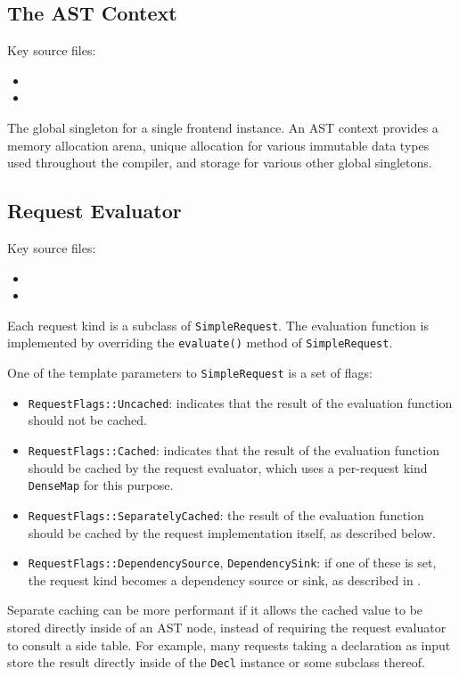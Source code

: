 \documentclass[../generics]{subfiles}
\begin{document}
\subsection*{The AST Context}
Key source files:
\begin{itemize}
\item {}
\item {}
\end{itemize}

The global singleton for a single frontend instance. An AST context provides a memory allocation arena, unique allocation for various immutable data types used throughout the compiler, and storage for various other global singletons.

\subsection*{Request Evaluator}
Key source files:
\begin{itemize}
\item {}
\item {}
\end{itemize}
Each request kind is a subclass of \texttt{SimpleRequest}. The evaluation function is implemented by overriding the \texttt{evaluate()} method of \texttt{SimpleRequest}.

One of the template parameters to \texttt{SimpleRequest} is a set of flags:
\begin{itemize}
\item \texttt{RequestFlags::Uncached}: indicates that the result of the evaluation function should not be cached.
\item \texttt{RequestFlags::Cached}: indicates that the result of the evaluation function should be cached by the request evaluator, which uses a per-request kind \texttt{DenseMap} for this purpose.
\item \texttt{RequestFlags::SeparatelyCached}: the result of the evaluation function should be cached by the request implementation itself, as described below.
\item \texttt{RequestFlags::DependencySource}, \texttt{DependencySink}: if one of these is set, the request kind becomes a dependency source or sink, as described in .
\end{itemize}
Separate caching can be more performant if it allows the cached value to be stored directly inside of an AST node, instead of requiring the request evaluator to consult a side table. For example, many requests taking a declaration as input store the result directly inside of the \texttt{Decl} instance or some subclass thereof.
\end{document}
